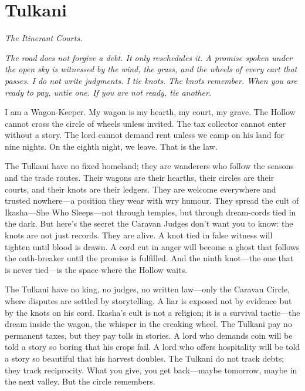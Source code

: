 \newpage

\newpage

\chapter{Tulkani}
\emph{The Itinerant Courts.}

\noindent
{\Large
\textit{The road does not forgive a debt. It only reschedules it. A promise spoken under the open sky is witnessed by the wind, the grass, and the wheels of every cart that passes. I do not write judgments. I tie knots. The knots remember. When you are ready to pay, untie one. If you are not ready, tie another.}

\vspace{0.5em}

I am a Wagon-Keeper. My wagon is my hearth, my court, my grave. The Hollow cannot cross the circle of wheels unless invited. The tax collector cannot enter without a story. The lord cannot demand rent unless we camp on his land for nine nights. On the eighth night, we leave. That is the law.

\vspace{0.5em}

The Tulkani have no fixed homeland; they are wanderers who follow the seasons and the trade routes. Their wagons are their hearths, their circles are their courts, and their knots are their ledgers. They are welcome everywhere and trusted nowhere---a position they wear with wry humour. They spread the cult of Ikasha---She Who Sleeps---not through temples, but through dream-cords tied in the dark. But here's the secret the Caravan Judges don't want you to know: the knots are not just records. They are alive. A knot tied in false witness will tighten until blood is drawn. A cord cut in anger will become a ghost that follows the oath-breaker until the promise is fulfilled. And the ninth knot---the one that is never tied---is the space where the Hollow waits.

\vspace{0.5em}

The Tulkani have no king, no judges, no written law---only the Caravan Circle, where disputes are settled by storytelling. A liar is exposed not by evidence but by the knots on his cord. Ikasha's cult is not a religion; it is a survival tactic---the dream inside the wagon, the whisper in the creaking wheel. The Tulkani pay no permanent taxes, but they pay tolls in stories. A lord who demands coin will be told a story so boring that his crops fail. A lord who offers hospitality will be told a story so beautiful that his harvest doubles. The Tulkani do not track debts; they track reciprocity. What you give, you get back---maybe tomorrow, maybe in the next valley. But the circle remembers.

}
